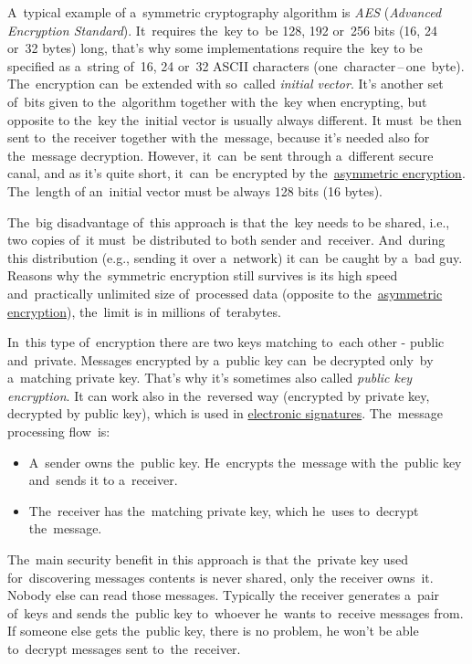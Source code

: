 A~typical example of a~symmetric cryptography algorithm is \textit{AES} (\textit{Advanced Encryption Standard}).
It~requires the~key to~be 128, 192 or~256 bits (16, 24 or~32 bytes) long, that's why some implementations require the~key to be specified as a~string of~16, 24 or~32 ASCII characters (one~character\,--\,one~byte).
The~encryption can~be extended with so~called \textit{initial vector}.
It's another set of~bits given to the~algorithm together with the~key when encrypting, but opposite to the~key the~initial vector is usually always different.
It must~be then sent to~the receiver together with the~message, because it's needed also for the~message decryption.
However, it~can~be sent through a~different secure canal, and as it's quite short, it~can~be encrypted by the~\hyperref[asymmetricencryption]{asymmetric encryption}.
The~length of an~initial vector must be always 128 bits (16 bytes).

The~big disadvantage of~this approach is that the~key needs to be shared, i.e., two copies of~it must~be distributed to both sender and~receiver.
And~during this distribution (e.g., sending it over a~network) it can~be caught by a~bad guy.
Reasons why the~symmetric encryption still survives is its high speed and~practically unlimited size of~processed data (opposite to the~\hyperref[asymmetricencryption]{asymmetric encryption}), the~limit is in millions of~\mbox{terabytes}.

\label{asymmetricencryption}
In~this type of~encryption there are two keys matching to~each other - public and~private.
Messages encrypted by a~public key can~be decrypted only~by a~matching private key.
That's why it's sometimes also called \textit{public key encryption}.
It can work also in the~reversed way (encrypted by private key, decrypted by public key), which is used in \hyperref[electronicsignature]{electronic signatures}.
The~message processing flow~is:
\begin{itemize}
    \item A~sender owns the~public key.
          He~encrypts the~message with the~public key and~sends it to a~receiver.
    \item The~receiver has the~matching private key, which he~uses to~decrypt the~message.
\end{itemize}

\noindent The~main security benefit in this approach is that the~private key used for~discovering messages contents is never shared, only the receiver owns~it.
Nobody else can read those messages.
Typically the receiver generates a~pair of~keys and sends the~public key to~whoever he~wants to~receive messages from.
If someone else gets the~public key, there is no problem, he won't be able to~decrypt messages sent to~the~receiver.
\newpage

